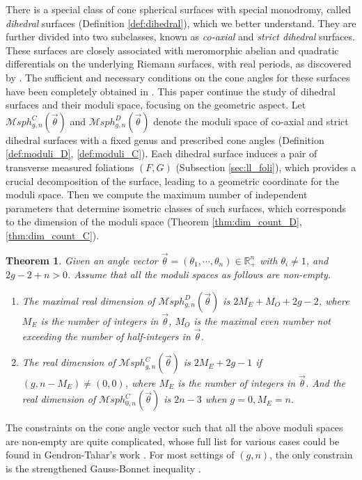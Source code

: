 \documentclass[pdflatex,sn-mathphys]{sn-jnl}%
\numberwithin{equation}{section}
\theoremstyle{thmstyleone}%
\newtheorem{theorem}{Theorem}[section]%
\newcommand{\RR}{\mathbb{R}}
\newcommand{\MsphC}[3]{\mathcal{M}sph^C_{#1,#2}(#3)}
\newcommand{\MsphgnD}{\mathcal{M}sph^D_{g,n}(\vec{\theta})}
\newcommand{\MsphgnC}{\mathcal{M}sph^C_{g,n}(\vec{\theta})}
\newcommand{\mfoli}{measured foliation}
\newcommand{\csphsf}{cone spherical surface}
\newcommand{\DEF}{\emph}
\begin{document}
\bigskip
There is a special class of \csphsf s with special monodromy, called \DEF{dihedral} surfaces (Definition \ref{def:dihedral}), which we better understand. They are further divided into two subclasses, known as \DEF{co-axial} and \DEF{strict dihedral} surfaces. These surfaces are closely associated with meromorphic abelian and quadratic differentials on the underlying Riemann surfaces, with real periods, as discovered by \cite{CWWX15, SCLX20}.
The sufficient and necessary conditions on the cone angles for these surfaces have been completely obtained in \cite{GT23}.
This paper continue the study of dihedral surfaces and their moduli space, focusing on the geometric aspect. Let $\MsphgnC$ and $\MsphgnD$ denote the moduli space of co-axial and strict dihedral surfaces with a fixed genus and prescribed cone angles (Definition \ref{def:moduli_D}, \ref{def:moduli_C}). Each dihedral surface induces a pair of transverse \mfoli s $(F,G)$ (Subsection \ref{sec:ll_foli}), which provides a crucial decomposition of the surface, leading to a geometric coordinate for the moduli space. Then we compute the maximum number of independent parameters that determine isometric classes of such surfaces, which corresponds to the dimension of the moduli space (Theorem \ref{thm:dim_count_D}, \ref{thm:dim_count_C}).
\begin{theorem}\label{thm:Main}
    Given an angle vector $\vec{\theta}=(\theta_1, \cdots, \theta_n) \in \RR^n_+$ with $\theta_i\neq1$, and $2g-2+n>0$. Assume that all the moduli spaces as follows are non-empty.
    \begin{enumerate}
        \item The maximal real dimension of $\MsphgnD$ is $2M_E+M_O+2g-2$, where $M_E$ is the number of integers in $\vec{\theta}$, $M_O$ is the maximal even number not exceeding the number of half-integers in $\vec{\theta}$.
        \item The real dimension of $\MsphgnC$ is $2M_E+2g-1$ if $(g,n-M_E)\neq(0,0)$, where $M_E$ is the number of integers in $\vec{\theta}$. And the real dimension of $\MsphC{0}{n}{\vec{\theta}}$ is $2n-3$ when $g=0, M_E=n$.
    \end{enumerate}
\end{theorem}
The constraints on the cone angle vector such that all the above moduli spaces are non-empty are quite complicated, whose full list for various cases could be found in Gendron-Tahar's work \cite{GT23}.
For most settings of $(g,n)$, the only constrain is the strengthened Gauss-Bonnet inequality \cite[Theorem 1.2]{GT23}.
\end{document}
